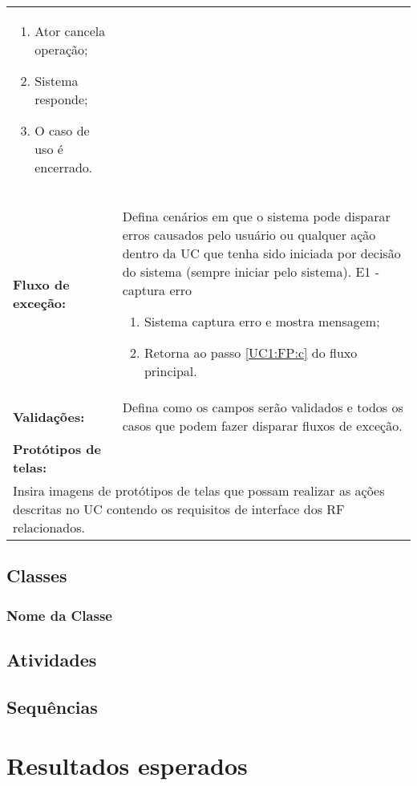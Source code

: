 \documentclass[12pt,openright,a4paper,brazil]{abntex2}
\begin{document}
\begin{longtable}{p{.25\linewidth}p{.7\linewidth}}
\begin{enumerate}[label=\alph*)]
	\item Ator cancela operação;
	\item Sistema responde;
	\item O caso de uso é encerrado.
\end{enumerate} \\
\textbf{Fluxo de exceção:} &
Defina cenários em que o sistema pode disparar erros causados pelo usuário ou qualquer ação dentro da UC que tenha sido iniciada por decisão do sistema (sempre iniciar pelo sistema).
\vspace{\onelineskip}
\label{UC1:FE:E1} E1 - captura erro
\begin{enumerate}[label=\alph*)]
	\item Sistema captura erro e mostra mensagem;
	\item Retorna ao passo \ref{UC1:FP:c} do fluxo principal.
\end{enumerate} \\
\textbf{Validações:} & Defina como os campos serão validados e todos os casos que podem fazer disparar fluxos de exceção. \\
\textbf{Protótipos de telas:} & \\
\multicolumn{2}{p{\linewidth}}{
	Insira imagens de protótipos de telas que possam realizar as ações descritas no UC contendo os requisitos de interface dos RF relacionados.
} \\
\end{longtable} 

\clearpage
\section{Classes}

\subsection{Nome da Classe}

\section{Atividades}

\section{Sequências}

\chapter{Resultados esperados}
\end{document}
